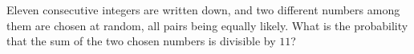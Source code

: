 Eleven consecutive integers are written down, and two different numbers among them are chosen at random, all pairs being equally likely. What is the probability that the sum of the two chosen numbers is divisible by $11$?
